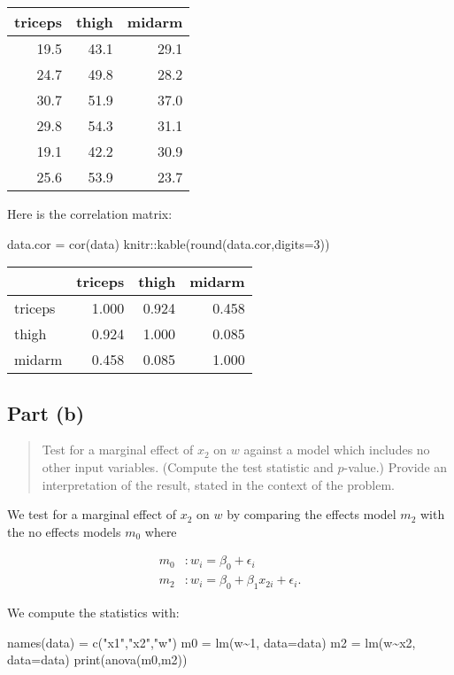 \documentclass[
]{article}
\newenvironment{Shaded}{\begin{snugshade}}{\end{snugshade}}
\newcommand{\AttributeTok}[1]{\textcolor[rgb]{0.77,0.63,0.00}{#1}}
\newcommand{\DecValTok}[1]{\textcolor[rgb]{0.00,0.00,0.81}{#1}}
\newcommand{\FunctionTok}[1]{\textcolor[rgb]{0.00,0.00,0.00}{#1}}
\newcommand{\NormalTok}[1]{#1}
\newcommand{\OtherTok}[1]{\textcolor[rgb]{0.56,0.35,0.01}{#1}}
\newcommand{\SpecialCharTok}[1]{\textcolor[rgb]{0.00,0.00,0.00}{#1}}
\newcommand{\StringTok}[1]{\textcolor[rgb]{0.31,0.60,0.02}{#1}}
\begin{document}
\begin{longtable}[]{@{}rrr@{}}
\toprule
triceps & thigh & midarm\tabularnewline
\midrule
\endhead
19.5 & 43.1 & 29.1\tabularnewline
24.7 & 49.8 & 28.2\tabularnewline
30.7 & 51.9 & 37.0\tabularnewline
29.8 & 54.3 & 31.1\tabularnewline
19.1 & 42.2 & 30.9\tabularnewline
25.6 & 53.9 & 23.7\tabularnewline
\bottomrule
\end{longtable}

Here is the correlation matrix:

\begin{Shaded}
\begin{Highlighting}[]
\NormalTok{data.cor }\OtherTok{=} \FunctionTok{cor}\NormalTok{(data)}
\NormalTok{knitr}\SpecialCharTok{::}\FunctionTok{kable}\NormalTok{(}\FunctionTok{round}\NormalTok{(data.cor,}\AttributeTok{digits=}\DecValTok{3}\NormalTok{))}
\end{Highlighting}
\end{Shaded}

\begin{longtable}[]{@{}lrrr@{}}
\toprule
& triceps & thigh & midarm\tabularnewline
\midrule
\endhead
triceps & 1.000 & 0.924 & 0.458\tabularnewline
thigh & 0.924 & 1.000 & 0.085\tabularnewline
midarm & 0.458 & 0.085 & 1.000\tabularnewline
\bottomrule
\end{longtable}

\hypertarget{part-b}{%
\subsection{Part (b)}\label{part-b}}

\begin{quote}
Test for a marginal effect of \(x_2\) on \(w\) against a model which
includes no other input variables. (Compute the test statistic and
\(p\)-value.) Provide an interpretation of the result, stated in the
context of the problem.
\end{quote}

We test for a marginal effect of \(x_2\) on \(w\) by comparing the
effects model \(m_2\) with the no effects models \(m_0\) where

\begin{align*}
    m_0 &: w_i = \beta_0 + \epsilon_i\\
    m_2 &: w_i = \beta_0 + \beta_1 x_{2 i} + \epsilon_i.
\end{align*}

We compute the statistics with:

\begin{Shaded}
\begin{Highlighting}[]
\FunctionTok{names}\NormalTok{(data) }\OtherTok{=} \FunctionTok{c}\NormalTok{(}\StringTok{"x1"}\NormalTok{,}\StringTok{"x2"}\NormalTok{,}\StringTok{"w"}\NormalTok{)}
\NormalTok{m0 }\OtherTok{=} \FunctionTok{lm}\NormalTok{(w}\SpecialCharTok{\textasciitilde{}}\DecValTok{1}\NormalTok{,  }\AttributeTok{data=}\NormalTok{data)}
\NormalTok{m2 }\OtherTok{=} \FunctionTok{lm}\NormalTok{(w}\SpecialCharTok{\textasciitilde{}}\NormalTok{x2, }\AttributeTok{data=}\NormalTok{data)}
\FunctionTok{print}\NormalTok{(}\FunctionTok{anova}\NormalTok{(m0,m2))}
\end{Highlighting}
\end{Shaded}
\end{document}
